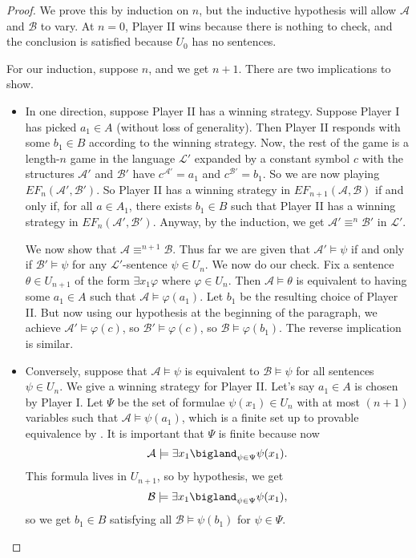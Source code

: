 \documentclass[../notes.tex]{subfiles}
\begin{document}
\begin{proof}
	We prove this by induction on $n$, but the inductive hypothesis will allow $\mathcal A$ and $\mathcal B$ to vary. At $n=0$, Player II wins because there is nothing to check, and the conclusion is satisfied because $U_0$ has no sentences.

	For our induction, suppose $n$, and we get $n+1$. There are two implications to show.
	\begin{itemize}
		\item In one direction, suppose Player II has a winning strategy. Suppose Player I has picked $a_1\in A$ (without loss of generality). Then Player II responds with some $b_1\in B$ according to the winning strategy. Now, the rest of the game is a length-$n$ game in the language $\mathcal L'$ expanded by a constant symbol $c$ with the structures $\mathcal A'$ and $\mathcal B'$ have $c^{\mathcal A'}=a_1$ and $c^{\mathcal B'}=b_1$. So we are now playing $EF_n(\mathcal A',\mathcal B')$. So Player II has a winning strategy in $EF_{n+1}(\mathcal A,\mathcal B)$ if and only if, for all $a\in A_1$, there exists $b_1\in B$ such that Player II has a winning strategy in $EF_{n}(\mathcal A',\mathcal B')$. Anyway, by the induction, we get $\mathcal A'\equiv^n\mathcal B'$ in $\mathcal L'$.

		We now show that $\mathcal A\equiv^{n+1}\mathcal B$. Thus far we are given that $\mathcal A'\models\psi$ if and only if $\mathcal B'\models\psi$ for any $\mathcal L'$-sentence $\psi\in U_n$. We now do our check. Fix a sentence $\theta\in U_{n+1}$ of the form $\exists x_1\varphi$ where $\varphi\in U_n$. Then $\mathcal A\models\theta$ is equivalent to having some $a_1\in A$ such that $\mathcal A\models\varphi(a_1)$. Let $b_1$ be the resulting choice of Player II. But now using our hypothesis at the beginning of the paragraph, we achieve $\mathcal A'\models\varphi(c)$, so $\mathcal B'\models\varphi(c)$, so $\mathcal B\models\varphi(b_1)$. The reverse implication is similar.

		\item Conversely, suppose that $\mathcal A\models\psi$ is equivalent to $\mathcal B\models\psi$ for all sentences $\psi\in U_n$. We give a winning strategy for Player II. Let's say $a_1\in A$ is chosen by Player I. Let $\Psi$ be the set of formulae $\psi(x_1)\in U_n$ with at most $(n+1)$ variables such that $\mathcal A\models\psi(a_1)$, which is a finite set up to provable equivalence by . It is important that $\Psi$ is finite because now
		\[\mathcal A\models\exists x_1\bigland_{\psi\in\Psi}\psi(x_1).\]
		This formula lives in $U_{n+1}$, so by hypothesis, we get
		\[\mathcal B\models\exists x_1\bigland_{\psi\in\Psi}\psi(x_1),\]
		so we get $b_1\in B$ satisfying all $\mathcal B\models\psi(b_1)$ for $\psi\in\Psi$.
	

\end{itemize}
\end{proof}
\end{document}
